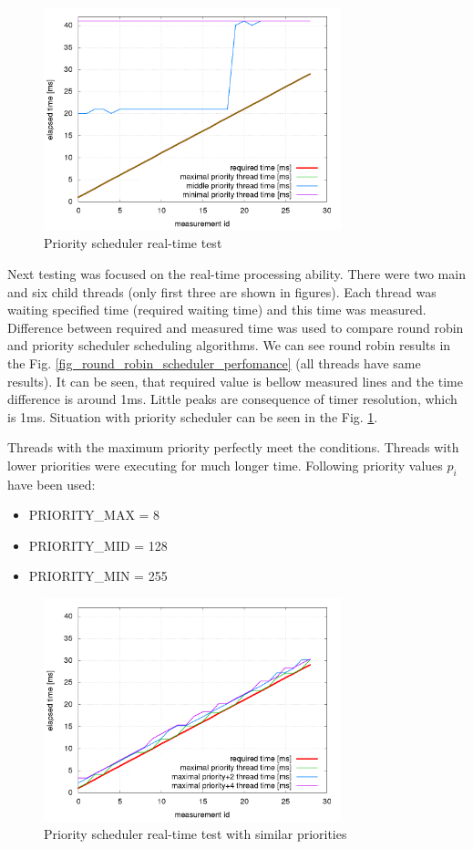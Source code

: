 \documentclass[a4paper, conference]{IEEEtran}
\begin{document}
\begin{figure}[]
\centering
\includegraphics[width=3.4in]{priority_scheduler_perfomance.png}
\caption{Priority scheduler real-time test}
\label{fig_priority_scheduler_perfomance}
\end{figure}



Next testing was focused on the real-time processing ability. There were two main and six child threads (only first three are shown in figures). Each thread was waiting specified time (required waiting time) and this time was measured. Difference between required and measured time was used to compare round robin and priority scheduler scheduling algorithms.
\balance
We can see round robin results in the Fig. \ref{fig_round_robin_scheduler_perfomance} (all threads have same results). It can be seen, that required value is bellow measured lines and the time difference is around 1ms. Little peaks are consequence of timer resolution, which is 1ms.
Situation with priority scheduler can be seen in the Fig. \ref{fig_priority_scheduler_perfomance}.




Threads with the maximum priority perfectly meet the conditions. Threads with lower priorities were executing for much longer time. Following priority values $p_i$ have been used:

\begin{itemize}
	\item PRIORITY\_MAX = 8
	\item PRIORITY\_MID = 128
	\item PRIORITY\_MIN = 255
\end{itemize}


\begin{figure}[h]
\centering
\includegraphics[width=3.4in]{priority_scheduler_similar_priority.png}
\caption{Priority scheduler real-time test with similar priorities}
\label{fig_priority_scheduler_similar_priority}
\end{figure}
\end{document}
